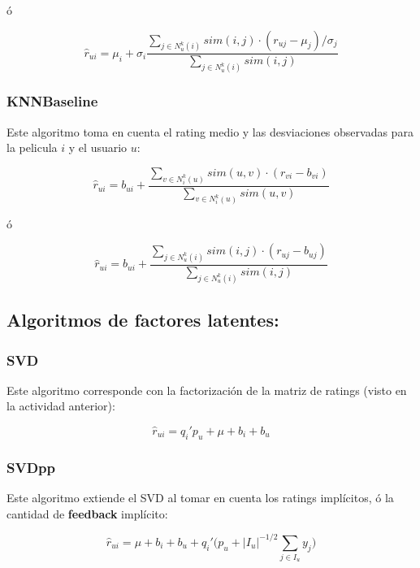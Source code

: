 \documentclass{article}
\begin{document}
ó

\begin{equation}
\hat r_{ui}=\mu_i + \sigma_i \frac{\sum_{j\in N_u^k(i)}sim(i,j) \cdot (r_{uj}-\mu_j)/\sigma_j}{\sum_{j\in N_u^k(i)}sim(i,j)}
\end{equation}


\subsubsection{KNNBaseline}

Este algoritmo toma en cuenta el rating medio y las desviaciones observadas para la pelicula $i$ y el usuario $u$:

\begin{equation}
\hat r_{ui}=b_{ui} + \frac{\sum_{v\in N_i^k(u)}sim(u,v) \cdot (r_{vi}-b_{vi})}{\sum_{v\in N_i^k(u)}sim(u,v)}
\end{equation}

ó

\begin{equation}
\hat r_{ui}=b_{ui} + \frac{\sum_{j\in N_u^k(i)}sim(i,j) \cdot (r_{uj}-b_{uj})}{\sum_{j\in N_u^k(i)}sim(i,j)}
\end{equation}

\subsection{Algoritmos de factores latentes:}

\subsubsection{SVD}

Este algoritmo corresponde con la factorización de la matriz de ratings (visto en la actividad anterior):

\begin{equation}
\hat r_{ui}=q_{i}'p_{u} + \mu + b_i + b_u
\end{equation}

\subsubsection{SVDpp}

Este algoritmo extiende el SVD al tomar en cuenta los ratings implícitos, ó la cantidad de \textbf{feedback} implícito:

\begin{equation}
\hat r_{ui}=\mu + b_i + b_u + q_{i}'\biggl(p_{u} + |I_u|^{-1/2} \sum_{j\in I_u} y_j \biggr)
\end{equation}
\end{document}
